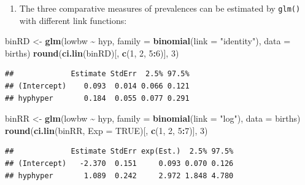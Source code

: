 \documentclass[
]{book}
\newenvironment{Shaded}{\begin{snugshade}}{\end{snugshade}}
\newcommand{\AttributeTok}[1]{\textcolor[rgb]{0.13,0.29,0.53}{#1}}
\newcommand{\ConstantTok}[1]{\textcolor[rgb]{0.56,0.35,0.01}{#1}}
\newcommand{\DecValTok}[1]{\textcolor[rgb]{0.00,0.00,0.81}{#1}}
\newcommand{\FunctionTok}[1]{\textcolor[rgb]{0.13,0.29,0.53}{\textbf{#1}}}
\newcommand{\NormalTok}[1]{#1}
\newcommand{\OtherTok}[1]{\textcolor[rgb]{0.56,0.35,0.01}{#1}}
\newcommand{\SpecialCharTok}[1]{\textcolor[rgb]{0.81,0.36,0.00}{\textbf{#1}}}
\newcommand{\StringTok}[1]{\textcolor[rgb]{0.31,0.60,0.02}{#1}}
\providecommand{\tightlist}{%
  \setlength{\itemsep}{0pt}\setlength{\parskip}{0pt}}
\begin{document}
\begin{enumerate}
\def\labelenumi{\arabic{enumi}.}
\setcounter{enumi}{1}
\tightlist
\item
  The three comparative measures of prevalences can be
  estimated by \texttt{glm()} with different link functions:
\end{enumerate}

\begin{Shaded}
\begin{Highlighting}[]
\NormalTok{binRD }\OtherTok{\textless{}{-}} \FunctionTok{glm}\NormalTok{(lowbw }\SpecialCharTok{\textasciitilde{}}\NormalTok{ hyp, }\AttributeTok{family =} \FunctionTok{binomial}\NormalTok{(}\AttributeTok{link =} \StringTok{"identity"}\NormalTok{), }\AttributeTok{data =}\NormalTok{ births)}
\FunctionTok{round}\NormalTok{(}\FunctionTok{ci.lin}\NormalTok{(binRD)[, }\FunctionTok{c}\NormalTok{(}\DecValTok{1}\NormalTok{, }\DecValTok{2}\NormalTok{, }\DecValTok{5}\SpecialCharTok{:}\DecValTok{6}\NormalTok{)], }\DecValTok{3}\NormalTok{)}
\end{Highlighting}
\end{Shaded}

\begin{verbatim}
##             Estimate StdErr  2.5% 97.5%
## (Intercept)    0.093  0.014 0.066 0.121
## hyphyper       0.184  0.055 0.077 0.291
\end{verbatim}

\begin{Shaded}
\begin{Highlighting}[]
\NormalTok{binRR }\OtherTok{\textless{}{-}} \FunctionTok{glm}\NormalTok{(lowbw }\SpecialCharTok{\textasciitilde{}}\NormalTok{ hyp, }\AttributeTok{family =} \FunctionTok{binomial}\NormalTok{(}\AttributeTok{link =} \StringTok{"log"}\NormalTok{), }\AttributeTok{data =}\NormalTok{ births)}
\FunctionTok{round}\NormalTok{(}\FunctionTok{ci.lin}\NormalTok{(binRR, }\AttributeTok{Exp =} \ConstantTok{TRUE}\NormalTok{)[, }\FunctionTok{c}\NormalTok{(}\DecValTok{1}\NormalTok{, }\DecValTok{2}\NormalTok{, }\DecValTok{5}\SpecialCharTok{:}\DecValTok{7}\NormalTok{)], }\DecValTok{3}\NormalTok{)}
\end{Highlighting}
\end{Shaded}

\begin{verbatim}
##             Estimate StdErr exp(Est.)  2.5% 97.5%
## (Intercept)   -2.370  0.151     0.093 0.070 0.126
## hyphyper       1.089  0.242     2.972 1.848 4.780
\end{verbatim}
\end{document}
